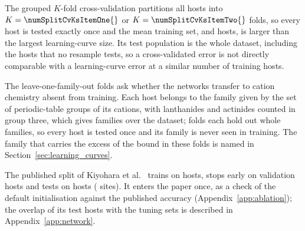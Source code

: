 The grouped $K$-fold cross-validation partitions all \numSplitCvNHosts{} hosts into $K = \numSplitCvKsItemOne{}$ or $K = \numSplitCvKsItemTwo{}$ folds, so every host is tested exactly once and the mean training set, \numCvGOneVTwoXTrainingHostsKTen{} and \numCvGOneVTwoXTrainingHostsKTwenty{} hosts, is larger than the largest learning-curve size. Its test population is the whole dataset, including the \numSplitMetaCoverageNeverInTest{} hosts that no resample tests, so a cross-validated error is not directly comparable with a learning-curve error at a similar number of training hosts.

The leave-one-family-out folds ask whether the networks transfer to cation chemistry absent from training. Each host belongs to the family given by the set of periodic-table groups of its cations, with lanthanides and actinides counted in group three, which gives \numSplitLocoNFamilies{} families over the dataset; \numSplitLocoNFolds{} folds each hold out whole families, so every host is tested once and its family is never seen in training. The family that carries the excess of the bound in these folds is named in Section~\ref{sec:learning_curves}.

The published split of Kiyohara et al.\ \citep{Kiyohara2025machinelearning} trains on \numFilterCascadeKiyoharaSplitHostsTrain{} hosts, stops early on \numFilterCascadeKiyoharaSplitHostsVal{} validation hosts and tests on \numFilterCascadeKiyoharaSplitHostsTest{} hosts (\numFilterCascadeKiyoharaSplitSitesTest{} sites). It enters the paper once, as a check of the default initialisation against the published accuracy (Appendix~\ref{app:ablation}); the overlap of its test hosts with the tuning sets is described in Appendix~\ref{app:network}.

